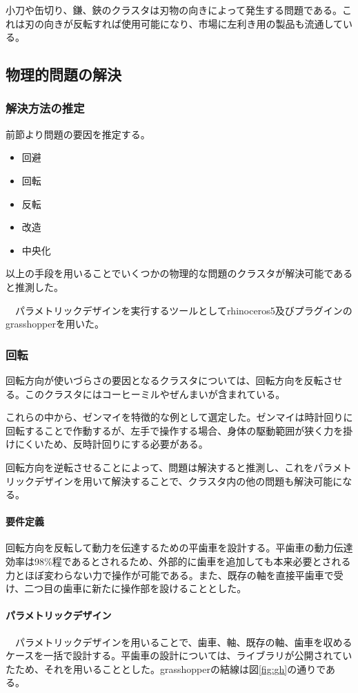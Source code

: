 \documentclass{jsarticle}
\begin{document}
小刀や缶切り、鎌、鋏のクラスタは刃物の向きによって発生する問題である。これは刃の向きが反転すれば使用可能になり、市場に左利き用の製品も流通している。
\newpage
\subsection{物理的問題の解決}

\subsubsection{解決方法の推定}
前節より問題の要因を推定する。

\begin{itemize}
  \item{回避}
  \item{回転}
  \item{反転}
  \item{改造}
  \item{中央化}
\end{itemize}

以上の手段を用いることでいくつかの物理的な問題のクラスタが解決可能であると推測した。

　パラメトリックデザインを実行するツールとしてrhinoceros5及びプラグインのgrasshopperを用いた。

\subsubsection{回転}
回転方向が使いづらさの要因となるクラスタについては、回転方向を反転させる。このクラスタにはコーヒーミルやぜんまいが含まれている。

これらの中から、ゼンマイを特徴的な例として選定した。ゼンマイは時計回りに回転することで作動するが、左手で操作する場合、身体の駆動範囲が狭く力を掛けにくいため、反時計回りにする必要がある。

回転方向を逆転させることによって、問題は解決すると推測し、これをパラメトリックデザインを用いて解決することで、クラスタ内の他の問題も解決可能になる。

\paragraph{要件定義}
回転方向を反転して動力を伝達するための平歯車を設計する。平歯車の動力伝達効率は98\%程であるとされるため、外部的に歯車を追加しても本来必要とされる力とほぼ変わらない力で操作が可能である。また、既存の軸を直接平歯車で受け、二つ目の歯車に新たに操作部を設けることとした。

\paragraph{パラメトリックデザイン}
　パラメトリックデザインを用いることで、歯車、軸、既存の軸、歯車を収めるケースを一括で設計する。平歯車の設計については、ライブラリが公開されていたため、それを用いることとした。grasshopperの結線は図\ref{fig:gh}の通りである。
\end{document}
